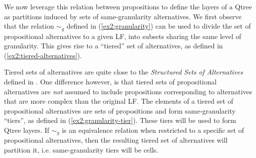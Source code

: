 We now leverage this relation between propositions to define the layers of a Qtree as partitions induced by sets of same-granularity alternatives. We first observe that the relation $\sim_g$ defined in (\ref{ex2:granularity}) can be used to divide the set of propositional alternatives to a given LF, into subsets sharing the same level of granularity. This gives rise to a ``tiered'' set of alternatives, as defined in (\ref{ex2:tiered-alternatives}). 
\begin{exe}
	 \label{ex2:tiered-alternatives}
\end{exe}

Tiered sets of alternatives are quite close to the \textit{Structured Sets of Alternatives} defined in \citet{Ippolito2019}. One difference however, is that tiered sets of propositional alternatives are \textit{not} assumed to include propositions corresponding to alternatives that are more complex than the original LF. The elements of a tiered set of propositional alternatives are sets of propositions and form same-granularity ``tiers'', as defined in (\ref{ex2:granularity-tier}). These tiers will be used to form Qtree layers. If $\sim_g$ is an equivalence relation when restricted to a specific set of propositional alternatives, then the resulting tiered set of alternatives will partition it, i.e. same-granularity tiers will be cells.

\begin{exe}
	\label{ex2:granularity-tier}
\end{exe}

